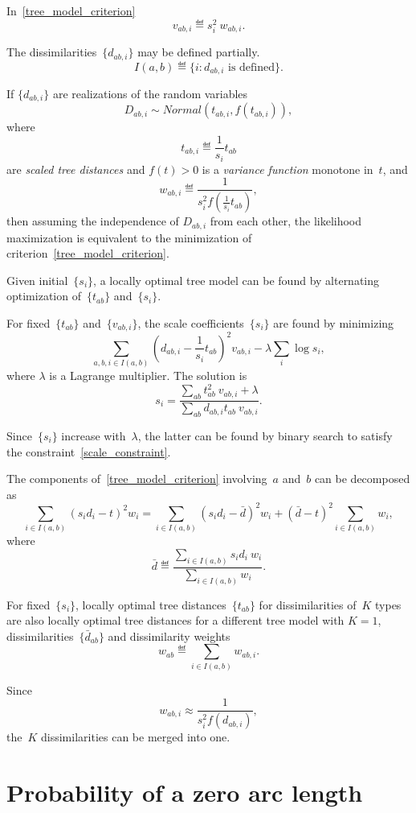 \documentclass[10pt,a4paper]{article}
\theoremstyle{plain} \newtheorem{Lem}{Lemma}
\begin{document}
  In~\ref{tree_model_criterion}
  $$ v_{ab,i} \eqdef s_i^2 \ w_{ab,i}. $$
  
  The dissimilarities~$\{d_{ab,i}\}$  may be defined partially.
  $$ I(a,b) \eqdef \{i:d_{ab,i} \textrm{ is defined}\}. $$
  
  If $\{d_{ab,i}\}$ are realizations of the random variables
  $$ D_{ab,i} \sim Normal (t_{ab,i}, f(t_{ab,i})), $$
  where 
  $$ t_{ab,i} \eqdef \frac 1 {s_i} t_{ab} $$
  are {\em scaled tree distances}
  and $f(t) > 0$  is a {\em variance function} monotone in~$t$,
  and
  $$ w_{ab,i} \eqdef \frac 1 {s_i^2 f\left(\frac 1 {s_i} t_{ab}\right)}, $$
  then assuming the independence of $D_{ab,i}$ from each other,
  the likelihood maximization is equivalent to the minimization of criterion~\ref{tree_model_criterion}.
  
  Given initial~$\{s_i\}$, a locally optimal tree model can be found by alternating optimization of~$\{t_{ab}\}$ and~$\{s_i\}$.
  
  For fixed~$\{t_{ab}\}$ and~$\{v_{ab,i}\}$, the scale coefficients~$\{s_i\}$ are found by minimizing 
  $$ \sum_{a,b,i \in I(a,b)} \left(d_{ab,i} - \frac 1 {s_i} t_{ab}\right)^2 v_{ab,i} - \lambda \sum_i \log s_i, $$
  where $\lambda$ is a Lagrange multiplier.
  The solution is
  $$ s_i = \frac {\sum_{ab} t_{ab}^2 \ v_{ab,i} + \lambda} {\sum_{ab} d_{ab,i} t_{ab} \ v_{ab,i}} . $$
  
  Since~$\{s_i\}$ increase with~$\lambda$, 
  the latter can be found by binary search to satisfy the constraint~\ref{scale_constraint}.
  
  The components of~\ref{tree_model_criterion} involving~$a$ and~$b$ can be decomposed as
  $$ \sum_{i \in I(a,b)} \left(s_i d_i - t\right)^2 w_i 
  = \sum_{i \in I(a,b)} \left(s_i d_i - \bar d \right)^2 w_i + (\bar d - t)^2 \sum_{i \in I(a,b)} w_i, 
  $$
  where 
  $$ \bar d \eqdef \frac {\sum_{i \in I(a,b)} s_i d_i \ w_i} {\sum_{i \in I(a,b)} w_i}. $$
  
  For fixed~$\{s_i\}$, locally optimal tree distances~$\{t_{ab}\}$ for dissimilarities of~$K$ types
  are also locally optimal tree distances for a different tree model with $K=1$, dissimilarities~$\{\bar d_{ab}\}$
  and dissimilarity weights
  $$ w_{ab} \eqdef \sum_{i \in I(a,b)} w_{ab,i}. $$
  
  Since
  $$ w_{ab,i} \approx \frac 1 {s_i^2 f(d_{ab,i})}, $$
  the~$K$ dissimilarities can be merged into one.


\section{Probability of a zero arc length}
\end{document}

